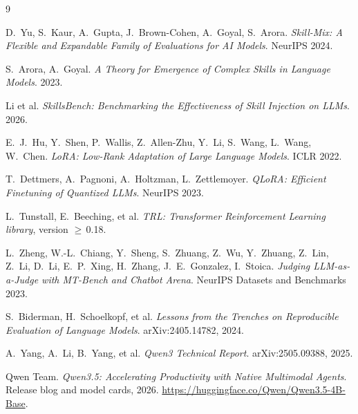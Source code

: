 \documentclass[10pt]{article}
\begin{document}
\begin{thebibliography}{9}

D.~Yu, S.~Kaur, A.~Gupta, J.~Brown-Cohen, A.~Goyal, S.~Arora.
\textit{Skill-Mix: A Flexible and Expandable Family of Evaluations for AI Models}.
NeurIPS 2024.

S.~Arora, A.~Goyal.
\textit{A Theory for Emergence of Complex Skills in Language Models}.
2023.

Li et al.
\textit{SkillsBench: Benchmarking the Effectiveness of Skill Injection on LLMs}.
2026.

E.~J.~Hu, Y.~Shen, P.~Wallis, Z.~Allen-Zhu, Y.~Li, S.~Wang, L.~Wang, W.~Chen.
\textit{LoRA: Low-Rank Adaptation of Large Language Models}.
ICLR 2022.

T.~Dettmers, A.~Pagnoni, A.~Holtzman, L.~Zettlemoyer.
\textit{QLoRA: Efficient Finetuning of Quantized LLMs}.
NeurIPS 2023.

L.~Tunstall, E.~Beeching, et al.
\textit{TRL: Transformer Reinforcement Learning library}, version $\geq$\,0.18.

L.~Zheng, W.-L.~Chiang, Y.~Sheng, S.~Zhuang, Z.~Wu, Y.~Zhuang, Z.~Lin, Z.~Li, D.~Li, E.~P.~Xing, H.~Zhang, J.~E.~Gonzalez, I.~Stoica.
\textit{Judging LLM-as-a-Judge with MT-Bench and Chatbot Arena}.
NeurIPS Datasets and Benchmarks 2023.

S.~Biderman, H.~Schoelkopf, et al.
\textit{Lessons from the Trenches on Reproducible Evaluation of Language Models}.
arXiv:2405.14782, 2024.

A.~Yang, A.~Li, B.~Yang, et al.
\textit{Qwen3 Technical Report}.
arXiv:2505.09388, 2025.

Qwen Team.
\textit{Qwen3.5: Accelerating Productivity with Native Multimodal Agents}.
Release blog and model cards, 2026.
\url{https://huggingface.co/Qwen/Qwen3.5-4B-Base}.

\end{thebibliography}

\appendix
\end{document}
